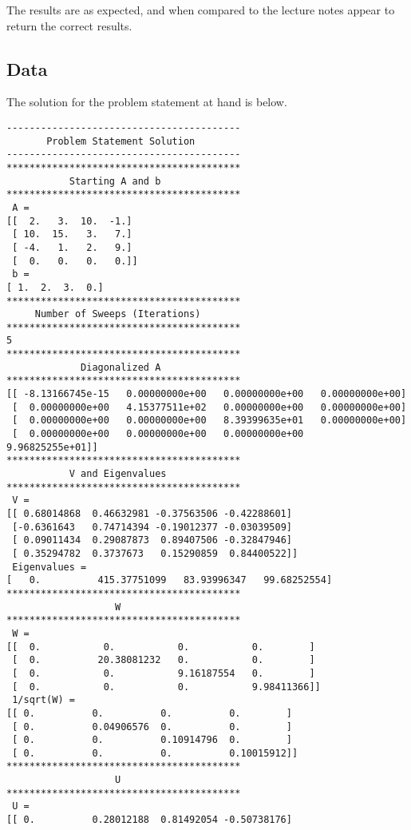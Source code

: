 \documentclass[10pt,letter]{article}
\begin{document}
The results are as expected, and when compared to the lecture notes appear to return the correct results.

\subsection{Data}

The solution for the problem statement at hand is below.

\begin{verbatim}
-----------------------------------------
       Problem Statement Solution        
-----------------------------------------
*****************************************
           Starting A and b              
*****************************************
 A = 
[[  2.   3.  10.  -1.]
 [ 10.  15.   3.   7.]
 [ -4.   1.   2.   9.]
 [  0.   0.   0.   0.]]
 b = 
[ 1.  2.  3.  0.]
*****************************************
     Number of Sweeps (Iterations)       
*****************************************
5
*****************************************
             Diagonalized A              
*****************************************
[[ -8.13166745e-15   0.00000000e+00   0.00000000e+00   0.00000000e+00]
 [  0.00000000e+00   4.15377511e+02   0.00000000e+00   0.00000000e+00]
 [  0.00000000e+00   0.00000000e+00   8.39399635e+01   0.00000000e+00]
 [  0.00000000e+00   0.00000000e+00   0.00000000e+00   9.96825255e+01]]
*****************************************
           V and Eigenvalues             
*****************************************
 V = 
[[ 0.68014868  0.46632981 -0.37563506 -0.42288601]
 [-0.6361643   0.74714394 -0.19012377 -0.03039509]
 [ 0.09011434  0.29087873  0.89407506 -0.32847946]
 [ 0.35294782  0.3737673   0.15290859  0.84400522]]
 Eigenvalues = 
[   0.          415.37751099   83.93996347   99.68252554]
*****************************************
                   W                     
*****************************************
 W = 
[[  0.           0.           0.           0.        ]
 [  0.          20.38081232   0.           0.        ]
 [  0.           0.           9.16187554   0.        ]
 [  0.           0.           0.           9.98411366]]
 1/sqrt(W) = 
[[ 0.          0.          0.          0.        ]
 [ 0.          0.04906576  0.          0.        ]
 [ 0.          0.          0.10914796  0.        ]
 [ 0.          0.          0.          0.10015912]]
*****************************************
                   U                     
*****************************************
 U = 
[[ 0.          0.28012188  0.81492054 -0.50738176]

\end{verbatim}
\end{document}

